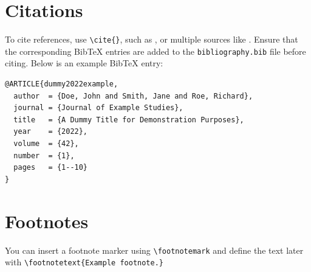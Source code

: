 \section{Citations}
\begin{paragraph}
To cite references, use \verb|\cite{}|, such as \cite{min2net}, or multiple sources like \cite{hu79, somework2020, tonio_paper}. Ensure that the corresponding BibTeX entries are added to the \texttt{bibliography.bib} file before citing. Below is an example BibTeX entry:
\end{paragraph}

\begin{verbatim}
@ARTICLE{dummy2022example,
  author  = {Doe, John and Smith, Jane and Roe, Richard},
  journal = {Journal of Example Studies},
  title   = {A Dummy Title for Demonstration Purposes},
  year    = {2022},
  volume  = {42},
  number  = {1},
  pages   = {1--10}
}
\end{verbatim}

\section{Footnotes}
\begin{paragraph}
You can insert a footnote marker using \verb|\footnotemark|\footnotemark{} and define the text later with \verb|\footnotetext{Example footnote.}|
\end{paragraph}
